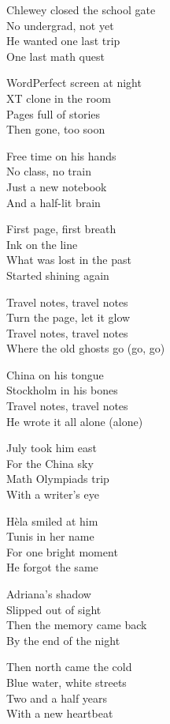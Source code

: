 \begin{lyrics}

Chlewey closed the school gate\\
No undergrad, not yet\\
He wanted one last trip\\
One last math quest

WordPerfect screen at night\\
XT clone in the room\\
Pages full of stories\\
Then gone, too soon

Free time on his hands\\
No class, no train\\
Just a new notebook\\
And a half-lit brain

First page, first breath\\
Ink on the line\\
What was lost in the past\\
Started shining again

Travel notes, travel notes\\
Turn the page, let it glow\\
Travel notes, travel notes\\
Where the old ghosts go (go, go)

China on his tongue\\
Stockholm in his bones\\
Travel notes, travel notes\\
He wrote it all alone (alone)

July took him east\\
For the China sky\\
Math Olympiads trip\\
With a writer’s eye

Hèla smiled at him\\
Tunis in her name\\
For one bright moment\\
He forgot the same

Adriana’s shadow\\
Slipped out of sight\\
Then the memory came back\\
By the end of the night

Then north came the cold\\
Blue water, white streets\\
Two and a half years\\
With a new heartbeat


\end{lyrics}
